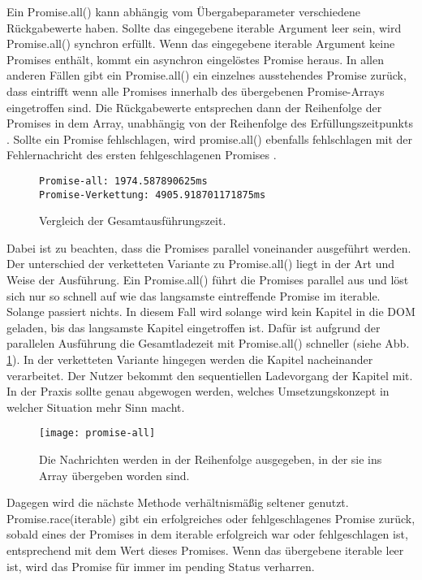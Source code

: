 \noindent
Ein Promise.all() kann abhängig vom Übergabeparameter verschiedene Rückgabewerte haben. Sollte das eingegebene iterable Argument leer sein, wird Promise.all() synchron erfüllt. Wenn das eingegebene iterable Argument keine Promises enthält, kommt ein asynchron eingelöstes Promise heraus. In allen anderen Fällen gibt ein Promise.all() ein einzelnes ausstehendes Promise zurück, dass eintrifft wenn alle Promises innerhalb des übergebenen Promise-Arrays eingetroffen sind. Die Rückgabewerte entsprechen dann der Reihenfolge der Promises in dem Array, unabhängig von der Reihenfolge des Erfüllungszeitpunkts \cite{promise-all}. Sollte ein Promise fehlschlagen, wird promise.all() ebenfalls fehlschlagen mit der Fehlernachricht des ersten fehlgeschlagenen Promises \cite{promise-executor}.\\

\begin{figure}[H]
\begin{lstlisting}
Promise-all: 1974.587890625ms
Promise-Verkettung: 4905.918701171875ms
\end{lstlisting}
\caption{Vergleich der Gesamtausführungszeit.}
\label{comparison-promise-all-and-chained-promise}
\end{figure}

\noindent
Dabei ist zu beachten, dass die Promises parallel voneinander ausgeführt werden. Der unterschied der verketteten Variante zu Promise.all() liegt in der Art und Weise der Ausführung. Ein Promise.all() führt die Promises parallel aus und löst sich nur so schnell auf wie das langsamste eintreffende Promise im iterable. Solange passiert nichts. In diesem Fall wird solange wird kein Kapitel in die DOM geladen, bis das langsamste Kapitel eingetroffen ist. Dafür ist aufgrund der parallelen Ausführung die Gesamtladezeit mit Promise.all() schneller (siehe Abb. \ref{comparison-promise-all-and-chained-promise}). In der verketteten Variante hingegen werden die Kapitel nacheinander verarbeitet. Der Nutzer bekommt den sequentiellen Ladevorgang der Kapitel mit. In der Praxis sollte genau abgewogen werden, welches Umsetzungskonzept in welcher Situation mehr Sinn macht.

\begin{figure}[H]
\centering
\texttt{[image: promise-all]}
\caption{Die Nachrichten werden in der Reihenfolge ausgegeben, in der sie ins Array übergeben worden sind.}
\end{figure}

\noindent
Dagegen wird die nächste Methode verhältnismäßig seltener genutzt. Promise.race(iterable) gibt ein erfolgreiches oder fehlgeschlagenes Promise zurück, sobald eines der Promises in dem iterable erfolgreich war oder fehlgeschlagen ist, entsprechend mit dem Wert dieses Promises. Wenn das übergebene iterable leer ist, wird das Promise für immer im pending Status verharren\cite{promise-race}.

